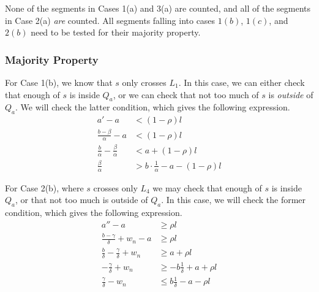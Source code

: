 None of the segments in Cases 1(a) and 3(a) are counted, and all of the segments in Case 2(a) \emph{are} counted. All segments falling into cases $1(b)$, $1(c)$, and $2(b)$ need to be tested for their majority property.


\subsubsection{Majority Property}

For Case 1(b), we know that $s$ only crosses $L_1$. In this case, we can either check that enough of $s$ is inside $Q_a$, or we can check that not too much of $s$ is \emph{outside} of $Q_a$.  We will check the latter condition, which gives the following expression.
\[
\begin{split}
a' - a &< (1 - \rho)l \\
%
\frac{b - \beta}{\alpha} - a &< (1 - \rho)l \\
%
\frac{b}{\alpha} - \frac{\beta}{\alpha} &< a + (1 - \rho)l \\
%
\frac{\beta}{\alpha} &> b\cdot \frac{1}{\alpha} - a - (1-\rho)l
%
\end{split}
\]

\noindent For Case 2(b), where $s$ crosses only $L_4$ we may check that enough of $s$ is inside $Q_a$, or that not too much is outside of $Q_a$. In this case, we will check the former condition, which gives the following expression.
\[
\begin{split}
a'' - a &\geq \rho l \\
%
\frac{b - \gamma}{\delta} + w_n - a &\geq \rho l \\
%
\frac{b}{\delta} - \frac{\gamma}{\delta} + w_n &\geq a + \rho l \\
%
- \frac{\gamma}{\delta} + w_n &\geq -b \frac{1}{\delta} + a + \rho l \\
%
\frac{\gamma}{\delta} - w_n &\leq b \frac{1}{\delta} - a - \rho l \\
%
\end{split}
\]

